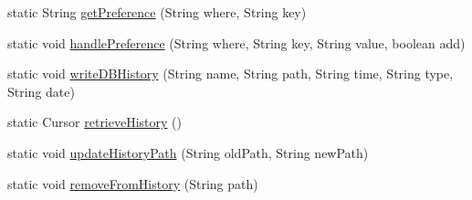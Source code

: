 \begin{DoxyCompactItemize}
static String \hyperlink{classandroid_1_1app_1_1printerapp_1_1devices_1_1database_1_1_database_controller_a5ff8875cbbb5311dfb570a046692b82b}{get\+Preference} (String where, String key)
\item 
static void \hyperlink{classandroid_1_1app_1_1printerapp_1_1devices_1_1database_1_1_database_controller_a324842844f4088b3a5f34c5c98d0f684}{handle\+Preference} (String where, String key, String value, boolean add)
\item 
static void \hyperlink{classandroid_1_1app_1_1printerapp_1_1devices_1_1database_1_1_database_controller_a3d61f7fc737402439209d4f5c0e5d06c}{write\+D\+B\+History} (String name, String path, String time, String type, String date)
\item 
static Cursor \hyperlink{classandroid_1_1app_1_1printerapp_1_1devices_1_1database_1_1_database_controller_a4d97e697cb4850e3bec9835da4985554}{retrieve\+History} ()
\item 
static void \hyperlink{classandroid_1_1app_1_1printerapp_1_1devices_1_1database_1_1_database_controller_a971f4a18ee4f24d167c4b836e6ee49ee}{update\+History\+Path} (String old\+Path, String new\+Path)
\item 
static void \hyperlink{classandroid_1_1app_1_1printerapp_1_1devices_1_1database_1_1_database_controller_a4ad5c6c04d6a67e2025e03c1fd1ac65c}{remove\+From\+History} (String path)
\end{DoxyCompactItemize}
